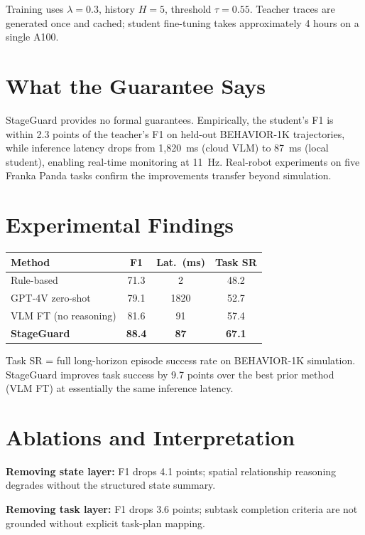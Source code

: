 \documentclass[10pt,twocolumn]{article}
\begin{document}
Training uses $\lambda = 0.3$, history $H=5$, threshold $\tau=0.55$.
Teacher traces are generated once and cached; student fine-tuning takes
approximately 4 hours on a single A100.

\section{What the Guarantee Says}

StageGuard provides no formal guarantees. Empirically, the student's F1
is within 2.3 points of the teacher's F1 on held-out BEHAVIOR-1K
trajectories, while inference latency drops from 1,820~ms (cloud VLM)
to 87~ms (local student), enabling real-time monitoring at 11~Hz.
Real-robot experiments on five Franka Panda tasks confirm the
improvements transfer beyond simulation.

\section{Experimental Findings}

\begin{center}
\small
\begin{tabular}{lccc}
\toprule
Method & F1 & Lat.\ (ms) & Task SR \\
\midrule
Rule-based & 71.3 & 2 & 48.2 \\
GPT-4V zero-shot & 79.1 & 1820 & 52.7 \\
VLM FT (no reasoning) & 81.6 & 91 & 57.4 \\
\textbf{StageGuard} & \textbf{88.4} & \textbf{87} & \textbf{67.1} \\
\bottomrule
\end{tabular}
\end{center}

Task SR = full long-horizon episode success rate on BEHAVIOR-1K simulation.
StageGuard improves task success by 9.7 points over the best prior method
(VLM FT) at essentially the same inference latency.

\section{Ablations and Interpretation}

\textbf{Removing state layer:} F1 drops 4.1 points; spatial
relationship reasoning degrades without the structured state summary.

\textbf{Removing task layer:} F1 drops 3.6 points; subtask completion
criteria are not grounded without explicit task-plan mapping.
\end{document}
